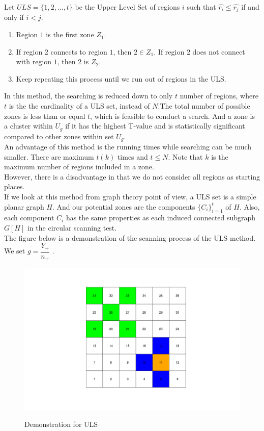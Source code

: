 \documentclass[12pt]{article}
\begin{document}
\begin{enumerate}
				Let $ULS= \{1,2,\dots,t\}$ be the Upper Level Set of regions $i$ such that $\hat{r_i} \leq \hat{r_j}$ if and only if $i < j$.  
				\begin{enumerate}
					\item Region $1$ is the first zone $Z_1$. 
					\item If region $2$ connects to region $1$, then $2 \in Z_1$. If region $2$ does not connect with region $1$, then $2$ is $Z_2$. 
					\item Keep repeating this process until we run out of regions in the ULS. \\   
				\end{enumerate}
			 In this method, the searching is reduced down to only $t$ number of regions, where $t$ is the the cardinality of a ULS set, instead of $N$.The total number of possible zones is less than or equal $t$, which is feasible to conduct a search. And a zone is a cluster within $U_g$ if it has the highest T-value and is statistically significant compared to other zones within set $U_g$.\\ 
		An advantage of this method is the running times while searching can be much smaller. There are maximum $t(k)$ times and $t \leq N$. Note that $k$ is the maximum number of regions included in a zone. \\	
		However, there is a disadvantage in that we do not consider all regions as starting places.\\
		
		If we look at this method from graph theory point of view, a ULS set is a simple planar graph $H$. And our potential zones are the components $\{C_i\}_{i=1}^{t}$ of $H$. Also, each component $C_i$ has the same properties as each induced connected subgraph $G[H]$ in the circular scanning test. \\  
				
	
	The figure below is a demonstration of the scanning process of the ULS method. We set $g = \dfrac{Y_+}{n_+}$ .\\
	\begin{figure}[!ht]
		
		\centering
		\includegraphics[scale=0.4]{Demo_ULS}\\
		\caption{Demonstration for ULS \label{f:gull}}
		

\end{figure}
\end{enumerate}
\end{document}
